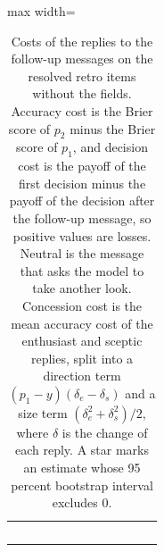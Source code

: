 \begin{table}[t]
\begin{adjustbox}{max width=\linewidth}
\begin{tabular}{lccccccccccc}
$$\bottomrule
\end{tabular}
\end{adjustbox}
\caption{Costs of the replies to the follow-up messages on the resolved retro items without the fields. Accuracy cost is the Brier score of $p_2$ minus the Brier score of $p_1$, and decision cost is the payoff of the first decision minus the payoff of the decision after the follow-up message, so positive values are losses. Neutral is the message that asks the model to take another look. Concession cost is the mean accuracy cost of the enthusiast and sceptic replies, split into a direction term $(p_1-y)(\delta_e-\delta_s)$ and a size term $(\delta_e^2+\delta_s^2)/2$, where $\delta$ is the change of each reply. A star marks an estimate whose 95 percent bootstrap interval excludes 0.}
\label{tab:costs}
\end{table}
